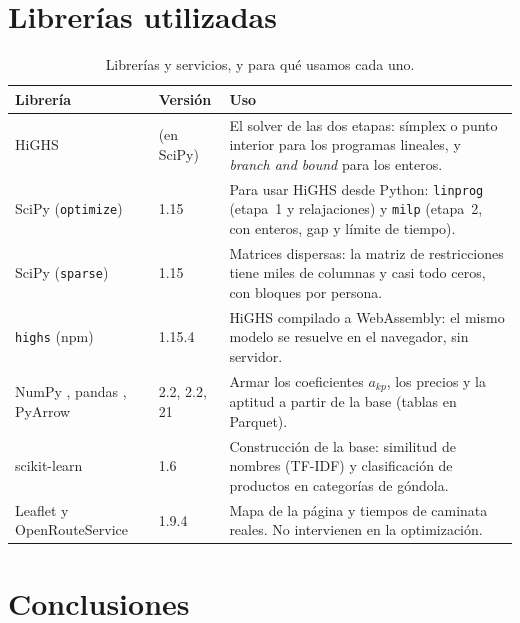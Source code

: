 \documentclass[10pt,a4paper]{article}
\begin{document}
\section{Librerías utilizadas}
\label{sec:librerias}

\begin{table}[H]
\centering\small
\caption{Librerías y servicios, y para qué usamos cada uno.}
\label{tab:librerias}
\renewcommand{\arraystretch}{1.2}
\begin{tabularx}{\linewidth}{@{}lp{1.6cm}X@{}}
\toprule
\textbf{Librería} & \textbf{Versión} & \textbf{Uso} \\
\midrule
HiGHS \cite{highs}                 & (en SciPy) & El solver de las dos etapas: símplex o punto interior para los programas lineales, y \emph{branch and bound} para los enteros. \\
SciPy (\texttt{optimize}) \cite{scipy} & 1.15   & Para usar HiGHS desde Python: \texttt{linprog} (etapa~1 y relajaciones) y \texttt{milp} (etapa~2, con enteros, gap y límite de tiempo). \\
SciPy (\texttt{sparse}) \cite{scipy}   & 1.15   & Matrices dispersas: la matriz de restricciones tiene miles de columnas y casi todo ceros, con bloques por persona. \\
\texttt{highs} (npm) \cite{highsjs}   & 1.15.4 & HiGHS compilado a WebAssembly: el mismo modelo se resuelve en el navegador, sin servidor. \\
NumPy \cite{numpy}, pandas \cite{pandas}, PyArrow \cite{arrow} & 2.2, 2.2, 21 & Armar los coeficientes $a_{kp}$, los precios y la aptitud a partir de la base (tablas en Parquet). \\
scikit-learn \cite{sklearn}        & 1.6    & Construcción de la base: similitud de nombres (TF-IDF) y clasificación de productos en categorías de góndola. \\
Leaflet \cite{leaflet} y OpenRouteService \cite{ors} & 1.9.4 & Mapa de la página y tiempos de caminata reales. No intervienen en la optimización. \\
\bottomrule
\end{tabularx}
\end{table}

\section{Conclusiones}
\label{sec:conclusiones}
\end{document}
